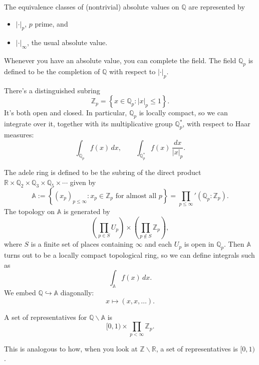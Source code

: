 \documentclass[reqno]{amsart} 
\begin{document}
\begin{theorem}[Ostrowski]
  The equivalence classes of (nontrivial) absolute values on $\mathbb{Q}$ are represented by
  \begin{itemize}
  \item $\lvert \cdot \rvert_p$, $p$ prime, and
  \item $\lvert \cdot \rvert_\infty$, the usual absolute value.
  \end{itemize}
\end{theorem}

Whenever you have an absolute value, you can complete the field.  The field $\mathbb{Q}_p$ is defined to be the completion of $\mathbb{Q}$ with respect to $\lvert \cdot \rvert_p$.

There's a distinguished subring
\begin{equation*}
  \mathbb{Z}_p = \left\{ x \in \mathbb{Q}_p : \lvert x \rvert_p \leq 1 \right\}.
\end{equation*}
It's both open and closed.  In particular, $\mathbb{Q}_p$ is locally compact, so we can integrate over it, together with its multiplicative group $\mathbb{Q}_p^\ast$, with respect to Haar measures:
\begin{equation*}
  \int_{\mathbb{Q}_p} f(x) \, d x,
  \qquad
  \int_{\mathbb{Q}_p^\ast} f(x)
  \, \frac{d x}{\lvert x \rvert_p}.
\end{equation*}

The adele ring is defined to be the subring of the direct product $\mathbb{R} \times \mathbb{Q}_2 \times \mathbb{Q}_3 \times \mathbb{Q}_5 \times \dotsb$ given by
\begin{equation*}
  \mathbb{A} := \left\{(x_p)_{p \leq \infty} : x_p \in \mathbb{Z}_p  \text{ for almost all }
    p \right\}
  =
  \prod_{p \leq \infty}'
  (\mathbb{Q}_p : \mathbb{Z}_p).
\end{equation*}
The topology on $\mathbb{A}$ is generated by
\begin{equation*}
  \left( \prod_{p \in S} U_p \right)
  \times \left( \prod_{p \notin S} \mathbb{Z}_p \right),
\end{equation*}
where $S$ is a finite set of places containing $\infty$ and each $U_p$ is open in $\mathbb{Q}_p$.  Then $\mathbb{A}$ turns out to be a locally compact topological ring, so we can define integrals such as
\begin{equation*}
  \int_{\mathbb{A}} f(x) \, d x.
\end{equation*}
We embed $\mathbb{Q} \hookrightarrow \mathbb{A}$ diagonally:
\begin{equation*}
  x \mapsto(x, x, \dotsc).
\end{equation*}
\begin{lemma}
  A set of representatives for $\mathbb{Q} \backslash \mathbb{A}$ is
  \begin{equation*}
    [0,1) \times \prod_{p < \infty} \mathbb{Z}_p.
  \end{equation*}
\end{lemma}
This is analogous to how, when you look at $\mathbb{Z} \backslash \mathbb{R}$, a set of representatives is $[0,1)$.
\end{document}
